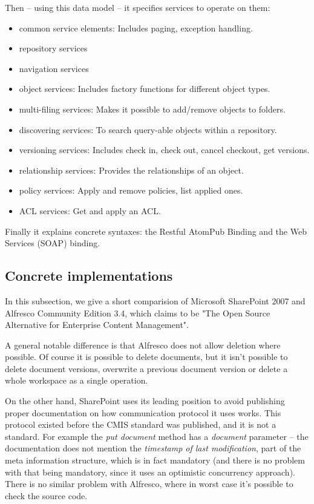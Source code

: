 Then -- using this data model -- it specifies services to operate on them:

\begin{itemize}
\item common service elements: Includes paging, exception handling.
\item repository services
\item navigation services
\item object services: Includes factory functions for different object types.
\item multi-filing services: Makes it possible to add/remove objects to folders.
\item discovering services: To search query-able objects within a repository.
\item versioning services: Includes check in, check out, cancel checkout, get
	versions.
\item relationship services: Provides the relationships of an object.
\item policy services: Apply and remove policies, list applied ones.
\item ACL services: Get and apply an ACL.
\end{itemize}

Finally it explains concrete syntaxes: the Restful AtomPub Binding and the Web
Services (SOAP) binding.

\subsection{Concrete implementations}

In this subsection, we give a short comparision of Microsoft SharePoint 2007 and
Alfresco Community Edition 3.4, which claims to be "The Open Source Alternative
for Enterprise Content Management".

A general notable difference is that Alfresco does not allow deletion where
possible. Of course it is possible to delete documents, but it isn't possible
to delete document versions, overwrite a previous document version or delete a
whole workspace as a single operation.

On the other hand, SharePoint uses its leading position to avoid publishing
proper documentation on how communication protocol it uses works. This protocol
existed before the CMIS standard was published, and it is not a standard. For
example the \emph{put document} method has a \emph{document} parameter -- the
documentation\cite{spdoc} does not mention the \emph{timestamp of last
modification}, part of the meta information structure, which is in fact
mandatory (and there is no problem with that being mandatory, since it uses an
optimistic concurrency approach). There is no similar problem with Alfresco,
where in worst case it's possible to check the source code.

